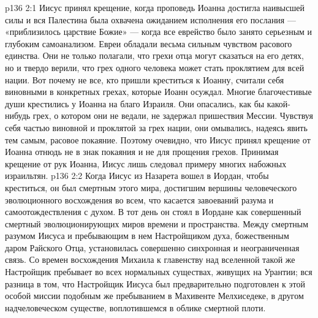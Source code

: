 \vs p136 2:1 Иисус принял крещение, когда проповедь Иоанна достигла наивысшей силы и вся Палестина была охвачена ожиданием исполнения его послания --- «приблизилось царствие Божие» --- когда все еврейство было занято серьезным и глубоким самоанализом. Евреи обладали весьма сильным чувством расового единства. Они не только полагали, что грехи отца могут сказаться на его детях, но и твердо верили, что грех одного человека может стать проклятием для всей нации. Вот почему не все, кто пришли креститься к Иоанну, считали себя виновными в конкретных грехах, которые Иоанн осуждал. Многие благочестивые души крестились у Иоанна на благо Израиля. Они опасались, как бы какой\hyp{}нибудь грех, о котором они не ведали, не задержал пришествия Мессии. Чувствуя себя частью виновной и проклятой за грех нации, они омывались, надеясь явить тем самым, расовое покаяние. Поэтому очевидно, что Иисус принял крещение от Иоанна отнюдь не в знак покаяния и не для прощения грехов. Принимая крещение от рук Иоанна, Иисус лишь следовал примеру многих набожных израильтян.
\vs p136 2:2 \pc Когда Иисус из Назарета вошел в Иордан, чтобы креститься, он был смертным этого мира, достигшим вершины человеческого эволюционного восхождения во всем, что касается завоеваний разума и самоотождествления с духом. В тот день он стоял в Иордане как совершенный смертный эволюционирующих миров времени и пространства. Между смертным разумом Иисуса и пребывающим в нем Настройщиком духа, божественным даром Райского Отца, установилась совершенно синхронная и неограниченная связь. Со времен восхождения Михаила к главенству над вселенной такой же Настройщик пребывает во всех нормальных существах, живущих на Урантии; вся разница в том, что Настройщик Иисуса был предварительно подготовлен к этой особой миссии подобным же пребыванием в Махивенте Мелхиседеке, в другом надчеловеческом существе, воплотившемся в облике смертной плоти.
